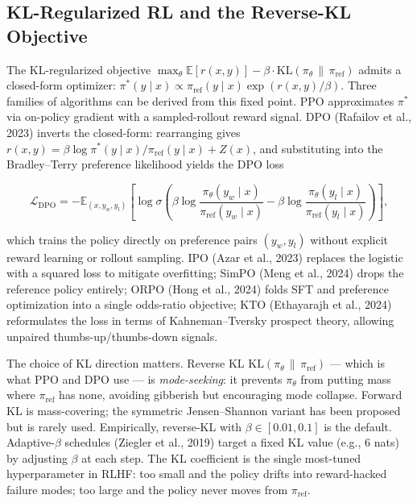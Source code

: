 \subsection{KL-Regularized RL and the Reverse-KL Objective}\label{kl-regularized-rl-and-the-reverse-kl-objective}

The KL-regularized objective \(\max_\theta \mathbb{E}[r(x, y)] - \beta \cdot \mathrm{KL}(\pi_\theta \,\|\, \pi_{\text{ref}})\) admits a closed-form optimizer: \(\pi^*(y \mid x) \propto \pi_{\text{ref}}(y \mid x) \exp(r(x, y)/\beta)\). Three families of algorithms can be derived from this fixed point. PPO approximates \(\pi^*\) via on-policy gradient with a sampled-rollout reward signal. DPO (Rafailov et al., 2023) inverts the closed-form: rearranging gives \(r(x, y) = \beta \log \pi^*(y \mid x)/\pi_{\text{ref}}(y \mid x) + Z(x)\), and substituting into the Bradley--Terry preference likelihood yields the DPO loss

\[\mathcal{L}_{\mathrm{DPO}} = -\mathbb{E}_{(x, y_w, y_l)} \left[ \log \sigma\!\left( \beta \log \frac{\pi_\theta(y_w \mid x)}{\pi_{\text{ref}}(y_w \mid x)} - \beta \log \frac{\pi_\theta(y_l \mid x)}{\pi_{\text{ref}}(y_l \mid x)} \right) \right],\]

which trains the policy directly on preference pairs \((y_w, y_l)\) without explicit reward learning or rollout sampling. IPO (Azar et al., 2023) replaces the logistic with a squared loss to mitigate overfitting; SimPO (Meng et al., 2024) drops the reference policy entirely; ORPO (Hong et al., 2024) folds SFT and preference optimization into a single odds-ratio objective; KTO (Ethayarajh et al., 2024) reformulates the loss in terms of Kahneman--Tversky prospect theory, allowing unpaired thumbs-up/thumbs-down signals.

The choice of KL direction matters. Reverse KL \(\mathrm{KL}(\pi_\theta \,\|\, \pi_{\text{ref}})\) --- which is what PPO and DPO use --- is \emph{mode-seeking}: it prevents \(\pi_\theta\) from putting mass where \(\pi_{\text{ref}}\) has none, avoiding gibberish but encouraging mode collapse. Forward KL is mass-covering; the symmetric Jensen--Shannon variant has been proposed but is rarely used. Empirically, reverse-KL with \(\beta \in [0.01, 0.1]\) is the default. Adaptive-\(\beta\) schedules (Ziegler et al., 2019) target a fixed KL value (e.g., 6 nats) by adjusting \(\beta\) at each step. The KL coefficient is the single most-tuned hyperparameter in RLHF: too small and the policy drifts into reward-hacked failure modes; too large and the policy never moves from \(\pi_{\text{ref}}\).

